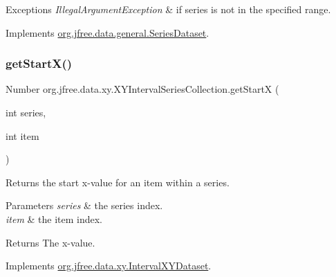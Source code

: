 \begin{DoxyExceptions}{Exceptions}
{\em Illegal\+Argument\+Exception} & if {\ttfamily series} is not in the specified range. \\
\hline
\end{DoxyExceptions}


Implements \mbox{\hyperlink{interfaceorg_1_1jfree_1_1data_1_1general_1_1_series_dataset_a60488892b2314a05a012999e26a74178}{org.\+jfree.\+data.\+general.\+Series\+Dataset}}.

\mbox{\label{classorg_1_1jfree_1_1data_1_1xy_1_1_x_y_interval_series_collection_af5acf7bf95c09bf1550d5d6a05f6ce4b}} 
\subsubsection{\texorpdfstring{get\+Start\+X()}{getStartX()}}
{\footnotesize\ttfamily Number org.\+jfree.\+data.\+xy.\+X\+Y\+Interval\+Series\+Collection.\+get\+StartX (\begin{DoxyParamCaption}\item[{int}]{series,  }\item[{int}]{item }\end{DoxyParamCaption})}

Returns the start x-\/value for an item within a series.


\begin{DoxyParams}{Parameters}
{\em series} & the series index. \\
\hline
{\em item} & the item index.\\
\hline
\end{DoxyParams}
\begin{DoxyReturn}{Returns}
The x-\/value. 
\end{DoxyReturn}


Implements \mbox{\hyperlink{interfaceorg_1_1jfree_1_1data_1_1xy_1_1_interval_x_y_dataset_a7548ec7d60d72463313dc6f10aceee62}{org.\+jfree.\+data.\+xy.\+Interval\+X\+Y\+Dataset}}.

\mbox{\label{classorg_1_1jfree_1_1data_1_1xy_1_1_x_y_interval_series_collection_a10718ae7eb5370e473b0c9f1c0e23d58}} 
